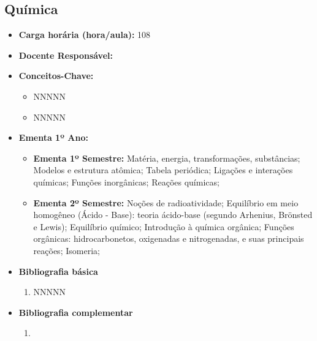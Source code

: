 \documentclass[11pt,fleqn]{book} %
\begin{document}
\newpage
\subsection{Química}\label{disc:quimica}
\begin{itemize}
	\item \textbf{Carga horária (hora/aula):} 108
	\item \textbf{Docente Responsável:}
	\item \textbf{Conceitos-Chave:}
	\begin{itemize}
		\item NNNNN
		\item NNNNN
	\end{itemize}
	\item \textbf{Ementa 1º Ano:}
	\begin{itemize}	
		\item \textbf{Ementa 1º Semestre:} 
		Matéria, energia, transformações, substâncias;
		Modelos e estrutura atômica;
		Tabela periódica;
		Ligações e interações químicas;
		Funções inorgânicas;
		Reações químicas;
		
		\item \textbf{Ementa 2º Semestre:} 	
		Noções de radioatividade;
		Equilíbrio em meio homogêneo (Ácido - Base): teoria ácido-base (segundo Arhenius, Brönsted e Lewis);
		Equilíbrio químico;
		Introdução à química orgânica;
		Funções orgânicas: hidrocarbonetos, oxigenadas e nitrogenadas, e suas principais reações; 
		Isomeria;
	\end{itemize}
	\item \textbf{Bibliografia básica}
	\begin{enumerate}
		\item NNNNN
	\end{enumerate}
	\item \textbf{Bibliografia complementar}
	\begin{enumerate}
		\item 
	\end{enumerate}	
\end{itemize}

\newpage
\end{document}
